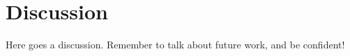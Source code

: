 
\chapter{Discussion}\label{discussion}

Here goes a discussion.
Remember to talk about future work, and be confident!
